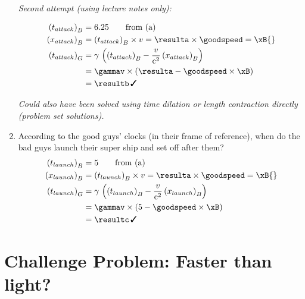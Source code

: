 \documentclass[pagesize,headsepline,10pt,parskip=half]{scrreprt}
\newcommand{\cmark}{\, \text{\ding{51}}}
\newcommand{\const}[1]{\mathrm{#1}}
\renewcommand{\c}{\const{c}}
\begin{document}
\begin{enumerate}
\begin{samepage}
            \emph{Second attempt (using lecture notes only):}

            \begin{align*}
              {(t_{attack})}_B &= 6.25 \qquad \text{from (a)}\\
              {(x_{attack})}_B &= {(t_{attack})}_B \times v = \resulta \times \goodspeed = \xB{}\\
              {(t_{attack})}_G
                &= \gamma \, \left({(t_{attack})}_B - \frac{v}{\c^2} \, {(x_{attack})}_B\right)\\
                &= \gammav \times \left(\resulta - \goodspeed \times \xB\right)\\
                &= \resultb \cmark
            \end{align*}
          \end{samepage}
          \emph{Could also have been solved using time dilation or
            length contraction directly (problem set solutions).}

        \item
          According to the good guys’ clocks (in their frame of reference),
          when do the bad guys launch their super ship and set off after them?
          \begin{align*}
            {(t_{launch})}_B &= 5 \qquad \text{from (a)}\\
            {(x_{launch})}_B &= {(t_{launch})}_B \times v = \resulta \times \goodspeed = \xB{}\\
            {(t_{launch})}_G
              &= \gamma \, \left({(t_{launch})}_B - \frac{v}{\c^2} \, {(x_{launch})}_B\right)\\
              &= \gammav \times \left(5 - \goodspeed \times \xB\right)\\
              &= \resultc \cmark
          \end{align*}
      \end{enumerate}

    \section{Challenge Problem: Faster than light?}
\end{document}

